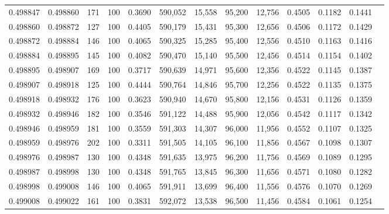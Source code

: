 \begin{tabular}{rrrrrrrrrrrrr}
0.498847 & 0.498860 &   171 & 100 &                                     0.3690 & 590,052 &  15,558 &  95,200 &  12,756 & 0.4505 & 0.1182 & 0.1441 \\
0.498860 & 0.498872 &   127 & 100 &                                     0.4405 & 590,179 &  15,431 &  95,300 &  12,656 & 0.4506 & 0.1172 & 0.1429 \\
0.498872 & 0.498884 &   146 & 100 &                                     0.4065 & 590,325 &  15,285 &  95,400 &  12,556 & 0.4510 & 0.1163 & 0.1416 \\
0.498884 & 0.498895 &   145 & 100 &                                     0.4082 & 590,470 &  15,140 &  95,500 &  12,456 & 0.4514 & 0.1154 & 0.1402 \\
0.498895 & 0.498907 &   169 & 100 &                                     0.3717 & 590,639 &  14,971 &  95,600 &  12,356 & 0.4522 & 0.1145 & 0.1387 \\
0.498907 & 0.498918 &   125 & 100 &                                     0.4444 & 590,764 &  14,846 &  95,700 &  12,256 & 0.4522 & 0.1135 & 0.1375 \\
0.498918 & 0.498932 &   176 & 100 &                                     0.3623 & 590,940 &  14,670 &  95,800 &  12,156 & 0.4531 & 0.1126 & 0.1359 \\
0.498932 & 0.498946 &   182 & 100 &                                     0.3546 & 591,122 &  14,488 &  95,900 &  12,056 & 0.4542 & 0.1117 & 0.1342 \\
0.498946 & 0.498959 &   181 & 100 &                                     0.3559 & 591,303 &  14,307 &  96,000 &  11,956 & 0.4552 & 0.1107 & 0.1325 \\
0.498959 & 0.498976 &   202 & 100 &                                     0.3311 & 591,505 &  14,105 &  96,100 &  11,856 & 0.4567 & 0.1098 & 0.1307 \\
0.498976 & 0.498987 &   130 & 100 &                                     0.4348 & 591,635 &  13,975 &  96,200 &  11,756 & 0.4569 & 0.1089 & 0.1295 \\
0.498987 & 0.498998 &   130 & 100 &                                     0.4348 & 591,765 &  13,845 &  96,300 &  11,656 & 0.4571 & 0.1080 & 0.1282 \\
0.498998 & 0.499008 &   146 & 100 &                                     0.4065 & 591,911 &  13,699 &  96,400 &  11,556 & 0.4576 & 0.1070 & 0.1269 \\
0.499008 & 0.499022 &   161 & 100 &                                     0.3831 & 592,072 &  13,538 &  96,500 &  11,456 & 0.4584 & 0.1061 & 0.1254 \\

\end{tabular}
